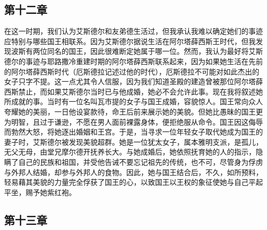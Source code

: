 
\subsection{第十二章}

在这一时期，我们认为艾斯德尔和友弟德生活过，但我承认我难以确定她们的事迹应特别与哪些国王相联系。因为艾斯德尔据说生活在阿尔塔薛西斯王时代，但我发现波斯有两位同名的国王，因此很难断定她属于哪一位。然而，我认为最好将艾斯德尔的事迹与耶路撒冷重建时期的阿尔塔薛西斯联系起来，因为如果她生活在先前的阿尔塔薛西斯时代（厄斯德拉记述过他的时代），厄斯德拉不可能对如此杰出的女子只字不提。这一点尤其令人信服，因为我们知道圣殿的建造曾被那位阿尔塔薛西斯禁止，而如果艾斯德尔当时已与他成婚，她必不会允许此事。现在我将叙述她所成就的事。当时有一位名叫瓦市提的女子与国王成婚，容貌惊人。国王常向众人夸耀她的美丽，一日他设宴款待，命王后前来展示她的美貌。但她比愚昧的国王更为明智，且过于谦逊，不愿在男人面前裸露身体，便拒绝服从命令。国王因这侮辱而勃然大怒，将她逐出婚姻和王宫。于是，当寻求一位年轻女子取代她成为国王的妻子时，艾斯德尔被发现美貌超群。她是一位犹太女子，属本雅明支派，是孤儿，无父无母，由堂兄摩尔德开抚养长大。与她成婚后，她依照抚育她的人的指示，隐瞒了自己的民族和祖国，并受他告诫不要忘记祖先的传统，也不可，尽管身为俘虏与外邦人结婚，却参与外邦人的食物。因此，她与国王结合后，不久，如所预料，轻易藉其美貌的力量完全俘获了国王的心，以致国王以王权的象征使她与自己平起平坐，赐予她紫红袍。\par


\subsection{第十三章}

